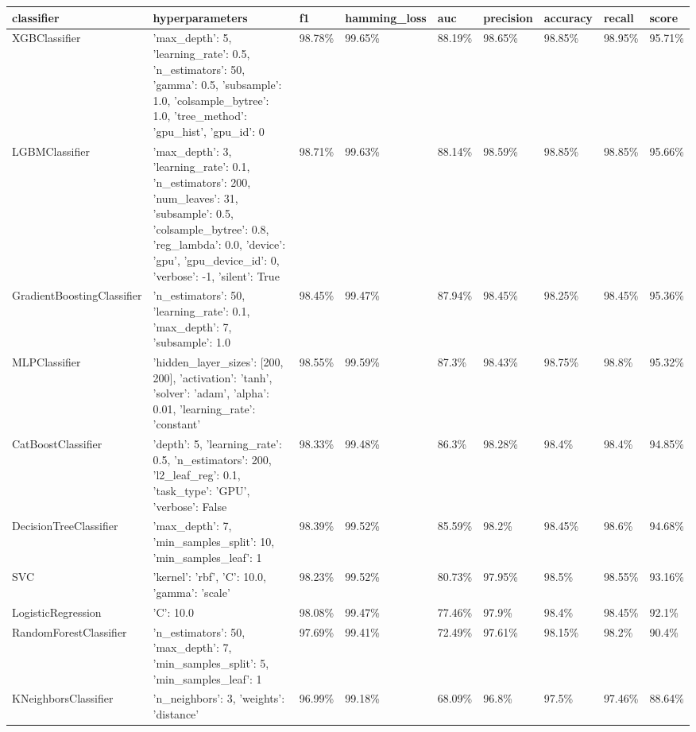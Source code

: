 \begin{tabular}{lllllllll}
\toprule
classifier & hyperparameters & f1 & hamming_loss & auc & precision & accuracy & recall & score \\
\midrule
XGBClassifier & {'max_depth': 5, 'learning_rate': 0.5, 'n_estimators': 50, 'gamma': 0.5, 'subsample': 1.0, 'colsample_bytree': 1.0, 'tree_method': 'gpu_hist', 'gpu_id': 0} & 98.78\% & 99.65\% & 88.19\% & 98.65\% & 98.85\% & 98.95\% & 95.71\% \\
LGBMClassifier & {'max_depth': 3, 'learning_rate': 0.1, 'n_estimators': 200, 'num_leaves': 31, 'subsample': 0.5, 'colsample_bytree': 0.8, 'reg_lambda': 0.0, 'device': 'gpu', 'gpu_device_id': 0, 'verbose': -1, 'silent': True} & 98.71\% & 99.63\% & 88.14\% & 98.59\% & 98.85\% & 98.85\% & 95.66\% \\
GradientBoostingClassifier & {'n_estimators': 50, 'learning_rate': 0.1, 'max_depth': 7, 'subsample': 1.0} & 98.45\% & 99.47\% & 87.94\% & 98.45\% & 98.25\% & 98.45\% & 95.36\% \\
MLPClassifier & {'hidden_layer_sizes': [200, 200], 'activation': 'tanh', 'solver': 'adam', 'alpha': 0.01, 'learning_rate': 'constant'} & 98.55\% & 99.59\% & 87.3\% & 98.43\% & 98.75\% & 98.8\% & 95.32\% \\
CatBoostClassifier & {'depth': 5, 'learning_rate': 0.5, 'n_estimators': 200, 'l2_leaf_reg': 0.1, 'task_type': 'GPU', 'verbose': False} & 98.33\% & 99.48\% & 86.3\% & 98.28\% & 98.4\% & 98.4\% & 94.85\% \\
DecisionTreeClassifier & {'max_depth': 7, 'min_samples_split': 10, 'min_samples_leaf': 1} & 98.39\% & 99.52\% & 85.59\% & 98.2\% & 98.45\% & 98.6\% & 94.68\% \\
SVC & {'kernel': 'rbf', 'C': 10.0, 'gamma': 'scale'} & 98.23\% & 99.52\% & 80.73\% & 97.95\% & 98.5\% & 98.55\% & 93.16\% \\
LogisticRegression & {'C': 10.0} & 98.08\% & 99.47\% & 77.46\% & 97.9\% & 98.4\% & 98.45\% & 92.1\% \\
RandomForestClassifier & {'n_estimators': 50, 'max_depth': 7, 'min_samples_split': 5, 'min_samples_leaf': 1} & 97.69\% & 99.41\% & 72.49\% & 97.61\% & 98.15\% & 98.2\% & 90.4\% \\
KNeighborsClassifier & {'n_neighbors': 3, 'weights': 'distance'} & 96.99\% & 99.18\% & 68.09\% & 96.8\% & 97.5\% & 97.46\% & 88.64\% \\
\bottomrule
\end{tabular}
